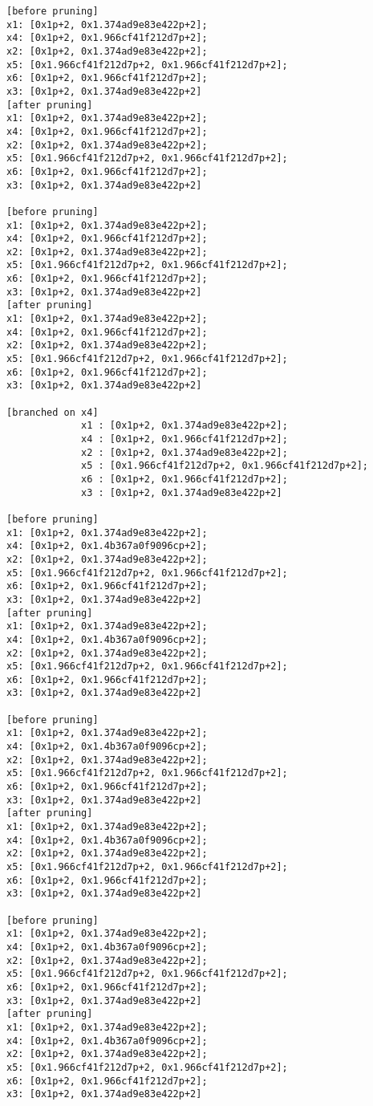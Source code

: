 \begin{lstlisting}
[before pruning]
x1: [0x1p+2, 0x1.374ad9e83e422p+2];
x4: [0x1p+2, 0x1.966cf41f212d7p+2];
x2: [0x1p+2, 0x1.374ad9e83e422p+2];
x5: [0x1.966cf41f212d7p+2, 0x1.966cf41f212d7p+2];
x6: [0x1p+2, 0x1.966cf41f212d7p+2];
x3: [0x1p+2, 0x1.374ad9e83e422p+2]
[after pruning]
x1: [0x1p+2, 0x1.374ad9e83e422p+2];
x4: [0x1p+2, 0x1.966cf41f212d7p+2];
x2: [0x1p+2, 0x1.374ad9e83e422p+2];
x5: [0x1.966cf41f212d7p+2, 0x1.966cf41f212d7p+2];
x6: [0x1p+2, 0x1.966cf41f212d7p+2];
x3: [0x1p+2, 0x1.374ad9e83e422p+2]

[before pruning]
x1: [0x1p+2, 0x1.374ad9e83e422p+2];
x4: [0x1p+2, 0x1.966cf41f212d7p+2];
x2: [0x1p+2, 0x1.374ad9e83e422p+2];
x5: [0x1.966cf41f212d7p+2, 0x1.966cf41f212d7p+2];
x6: [0x1p+2, 0x1.966cf41f212d7p+2];
x3: [0x1p+2, 0x1.374ad9e83e422p+2]
[after pruning]
x1: [0x1p+2, 0x1.374ad9e83e422p+2];
x4: [0x1p+2, 0x1.966cf41f212d7p+2];
x2: [0x1p+2, 0x1.374ad9e83e422p+2];
x5: [0x1.966cf41f212d7p+2, 0x1.966cf41f212d7p+2];
x6: [0x1p+2, 0x1.966cf41f212d7p+2];
x3: [0x1p+2, 0x1.374ad9e83e422p+2]

[branched on x4]
             x1 : [0x1p+2, 0x1.374ad9e83e422p+2];
             x4 : [0x1p+2, 0x1.966cf41f212d7p+2];
             x2 : [0x1p+2, 0x1.374ad9e83e422p+2];
             x5 : [0x1.966cf41f212d7p+2, 0x1.966cf41f212d7p+2];
             x6 : [0x1p+2, 0x1.966cf41f212d7p+2];
             x3 : [0x1p+2, 0x1.374ad9e83e422p+2]

[before pruning]
x1: [0x1p+2, 0x1.374ad9e83e422p+2];
x4: [0x1p+2, 0x1.4b367a0f9096cp+2];
x2: [0x1p+2, 0x1.374ad9e83e422p+2];
x5: [0x1.966cf41f212d7p+2, 0x1.966cf41f212d7p+2];
x6: [0x1p+2, 0x1.966cf41f212d7p+2];
x3: [0x1p+2, 0x1.374ad9e83e422p+2]
[after pruning]
x1: [0x1p+2, 0x1.374ad9e83e422p+2];
x4: [0x1p+2, 0x1.4b367a0f9096cp+2];
x2: [0x1p+2, 0x1.374ad9e83e422p+2];
x5: [0x1.966cf41f212d7p+2, 0x1.966cf41f212d7p+2];
x6: [0x1p+2, 0x1.966cf41f212d7p+2];
x3: [0x1p+2, 0x1.374ad9e83e422p+2]

[before pruning]
x1: [0x1p+2, 0x1.374ad9e83e422p+2];
x4: [0x1p+2, 0x1.4b367a0f9096cp+2];
x2: [0x1p+2, 0x1.374ad9e83e422p+2];
x5: [0x1.966cf41f212d7p+2, 0x1.966cf41f212d7p+2];
x6: [0x1p+2, 0x1.966cf41f212d7p+2];
x3: [0x1p+2, 0x1.374ad9e83e422p+2]
[after pruning]
x1: [0x1p+2, 0x1.374ad9e83e422p+2];
x4: [0x1p+2, 0x1.4b367a0f9096cp+2];
x2: [0x1p+2, 0x1.374ad9e83e422p+2];
x5: [0x1.966cf41f212d7p+2, 0x1.966cf41f212d7p+2];
x6: [0x1p+2, 0x1.966cf41f212d7p+2];
x3: [0x1p+2, 0x1.374ad9e83e422p+2]

[before pruning]
x1: [0x1p+2, 0x1.374ad9e83e422p+2];
x4: [0x1p+2, 0x1.4b367a0f9096cp+2];
x2: [0x1p+2, 0x1.374ad9e83e422p+2];
x5: [0x1.966cf41f212d7p+2, 0x1.966cf41f212d7p+2];
x6: [0x1p+2, 0x1.966cf41f212d7p+2];
x3: [0x1p+2, 0x1.374ad9e83e422p+2]
[after pruning]
x1: [0x1p+2, 0x1.374ad9e83e422p+2];
x4: [0x1p+2, 0x1.4b367a0f9096cp+2];
x2: [0x1p+2, 0x1.374ad9e83e422p+2];
x5: [0x1.966cf41f212d7p+2, 0x1.966cf41f212d7p+2];
x6: [0x1p+2, 0x1.966cf41f212d7p+2];
x3: [0x1p+2, 0x1.374ad9e83e422p+2]


\end{lstlisting}
